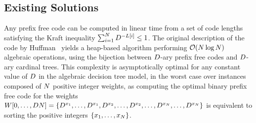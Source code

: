 \documentclass{llncs}
\providecommand{\Oh}{\ensuremath{{\cal O}}}
\providecommand{\nbWeights}{{\ensuremath N}}
\providecommand{\weight}[1]{{\ensuremath W[#1]}}
\providecommand{\nbSymbols}{{\ensuremath D}}
\providecommand{\codeLength}[1]{{\ensuremath L[#1]}}
\begin{document}
\subsection*{Existing Solutions}
\label{stateOfTheArt}

Any prefix free code can be computed in linear time from a set of code lengths satisfying the Kraft inequality $\sum_{i=1}^\nbWeights\nbSymbols^{-\codeLength{i}}\leq1$.
The original description of the code by Huffman~\cite{1952-IRE-AMethodForTheInstructionOfMinimumRedundancyCodes-Huffman} yields a heap-based algorithm performing $\Oh(\nbWeights\log\nbWeights)$ algebraic operations, using the bijection between $\nbSymbols$-ary prefix free codes and $\nbSymbols$-ary cardinal trees.
This complexity is asymptotically optimal for any constant value of $\nbSymbols$ in the algebraic decision tree model, in the worst case over instances composed of $\nbWeights$ positive integer weights, as computing the optimal binary prefix free code for the weights 
$\weight{0,\ldots,\nbSymbols\nbWeights}=\{\nbSymbols^{x_1},\ldots,\nbSymbols^{x_1},\nbSymbols^{x_2},\ldots,\nbSymbols^{x_2},\ldots,\nbSymbols^{x_\nbWeights},\ldots,\nbSymbols^{x_\nbWeights}\}$ is equivalent to sorting the positive integers $\{x_1,\ldots,x_\nbWeights\}$.
\end{document}
